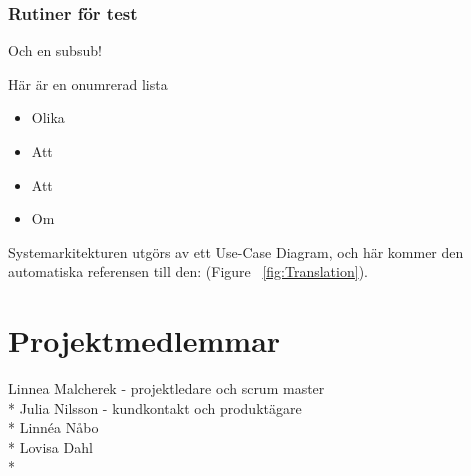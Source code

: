 \documentclass[11pt]{article} %
\begin{document}
\subsubsection{Rutiner för test}
Och en subsub!

Här är en onumrerad lista
\begin{itemize}
\item Olika
\item Att 
\item Att
\item Om 
\end{itemize}



Systemarkitekturen utgörs av ett Use-Case Diagram, och här kommer den automatiska referensen till den:   (Figure ~\ref{fig:Translation}).



\pagebreak


\section{Projektmedlemmar}

Linnea Malcherek - projektledare och scrum master\\*
Julia Nilsson - kundkontakt och produktägare\\*
Linnéa Nåbo \\*
Lovisa Dahl\\*
\end{document}
